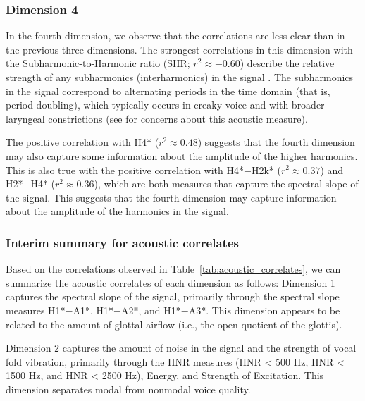 \subsubsection{Dimension 4} \label{sec:acousticlandscape:dim4}

In the fourth dimension, we observe that the correlations are less clear than in the previous three dimensions. The strongest correlations in this dimension with the Subharmonic-to-Harmonic ratio (SHR; $r^{2} \approx -0.60$) describe the relative strength of any subharmonics (interharmonics) in the signal \citep{sunPitchDeterminationVoice2002}. The subharmonics in the signal correspond to alternating periods in the time domain (that is, period doubling), which typically occurs in creaky voice and with broader laryngeal constrictions (see \cite{herbstPerformanceEvaluationSubharmonictoHarmonic2021} for concerns about this acoustic measure). 

The positive correlation with H4* ($r^{2} \approx 0.48$) suggests that the fourth dimension may also capture some information about the amplitude of the higher harmonics. This is also true with the positive correlation with H4*$-$H2k* ($r^{2} \approx 0.37$) and H2*$-$H4* ($r^{2} \approx 0.36$), which are both measures that capture the spectral slope of the signal. This suggests that the fourth dimension may capture information about the amplitude of the harmonics in the signal. 

\subsubsection{Interim summary for acoustic correlates} \label{sec:acousticlandscape:interim_correlates}

Based on the correlations observed in Table~\ref{tab:acoustic_correlates}, we can summarize the acoustic correlates of each dimension as follows: Dimension 1 captures the spectral slope of the signal, primarily through the spectral slope measures H1*$-$A1*, H1*$-$A2*, and H1*$-$A3*. This dimension appears to be related to the amount of glottal airflow (i.e., the open-quotient of the glottis). 

Dimension 2 captures the amount of noise in the signal and the strength of vocal fold vibration, primarily through the HNR measures (HNR < 500 Hz, HNR < 1500 Hz, and HNR < 2500 Hz), Energy, and Strength of Excitation. This dimension separates modal from nonmodal voice quality.

